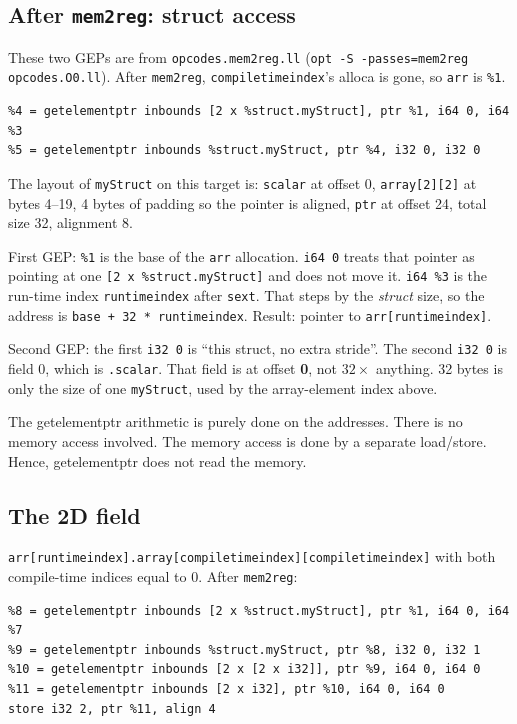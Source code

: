 \documentclass[11pt,a4paper]{article}
\begin{document}
\subsection*{After \texttt{mem2reg}: struct access}

These two GEPs are from \texttt{opcodes.mem2reg.ll}
(\texttt{opt -S -passes=mem2reg opcodes.O0.ll}). After
\texttt{mem2reg}, \texttt{compiletimeindex}'s alloca is gone, so
\texttt{arr} is \texttt{\%1}.

\begin{lstlisting}
%4 = getelementptr inbounds [2 x %struct.myStruct], ptr %1, i64 0, i64 %3
%5 = getelementptr inbounds %struct.myStruct, ptr %4, i32 0, i32 0
\end{lstlisting}

The layout of \texttt{myStruct} on this target is: \texttt{scalar} at offset 0,
\texttt{array[2][2]} at bytes 4--19, 4 bytes of padding so the pointer is
aligned, \texttt{ptr} at offset 24, total size 32, alignment 8.

First GEP: \texttt{\%1} is the base of the \texttt{arr} allocation.
\texttt{i64 0} treats that pointer as pointing at one
\texttt{[2 x \%struct.myStruct]} and does not move it.
\texttt{i64 \%3} is the run-time index \texttt{runtimeindex} after
\texttt{sext}. That steps by the \emph{struct} size, so the address is
\texttt{base + 32 * runtimeindex}. Result: pointer to
\texttt{arr[runtimeindex]}.

Second GEP: the first \texttt{i32 0} is ``this struct, no extra stride''.
The second \texttt{i32 0} is field 0, which is \texttt{.scalar}. That field
is at offset \textbf{0}, not $32 \times$ anything. 32 bytes is only the
size of one \texttt{myStruct}, used by the array-element index above.

The getelementptr arithmetic is purely done on the addresses. There is no
memory access involved. The memory access is done by a separate load/store.
Hence, getelementptr does not read the memory.

\subsection*{The 2D field}

\texttt{arr[runtimeindex].array[compiletimeindex][compiletimeindex]} with
both compile-time indices equal to 0. After \texttt{mem2reg}:

\begin{lstlisting}
%8 = getelementptr inbounds [2 x %struct.myStruct], ptr %1, i64 0, i64 %7
%9 = getelementptr inbounds %struct.myStruct, ptr %8, i32 0, i32 1
%10 = getelementptr inbounds [2 x [2 x i32]], ptr %9, i64 0, i64 0
%11 = getelementptr inbounds [2 x i32], ptr %10, i64 0, i64 0
store i32 2, ptr %11, align 4
\end{lstlisting}
\end{document}
